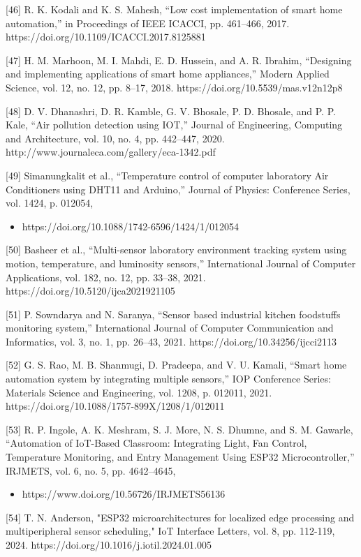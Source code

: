 [46] R. K. Kodali and K. S. Mahesh, ``Low cost implementation of smart home
automation,'' in Proceedings of IEEE ICACCI, pp. 461--466, 2017.
https://doi.org/10.1109/ICACCI.2017.8125881

[47] H. M. Marhoon, M. I. Mahdi, E. D. Hussein, and A. R. Ibrahim, ``Designing and
implementing applications of smart home appliances,'' Modern Applied Science, vol. 12,
no. 12, pp. 8--17, 2018. https://doi.org/10.5539/mas.v12n12p8

[48] D. V. Dhanashri, D. R. Kamble, G. V. Bhosale, P. D. Bhosale, and P. P. Kale, ``Air
pollution detection using IOT,'' Journal of Engineering, Computing and Architecture, vol.
10, no. 4, pp. 442--447, 2020. http://www.journaleca.com/gallery/eca-1342.pdf

[49] Simanungkalit et al., ``Temperature control of computer laboratory Air Conditioners
using DHT11 and Arduino,'' Journal of Physics: Conference Series, vol. 1424, p. 012054,
\begin{itemize}
  \item https://doi.org/10.1088/1742-6596/1424/1/012054
\end{itemize}

[50] Basheer et al., ``Multi-sensor laboratory environment tracking system using motion,
temperature, and luminosity sensors,'' International Journal of Computer Applications,
vol. 182, no. 12, pp. 33--38, 2021. https://doi.org/10.5120/ijca2021921105

[51] P. Sowndarya and N. Saranya, ``Sensor based industrial kitchen foodstuffs
monitoring system,'' International Journal of Computer Communication and Informatics,
vol. 3, no. 1, pp. 26--43, 2021. https://doi.org/10.34256/ijcci2113

[52] G. S. Rao, M. B. Shanmugi, D. Pradeepa, and V. U. Kamali, ``Smart home automation
system by integrating multiple sensors,'' IOP Conference Series: Materials Science and
Engineering, vol. 1208, p. 012011, 2021. https://doi.org/10.1088/1757-899X/1208/1/012011

[53] R. P. Ingole, A. K. Meshram, S. J. More, N. S. Dhumne, and S. M. Gawarle, ``Automation
of IoT-Based Classroom: Integrating Light, Fan Control, Temperature Monitoring, and
Entry Management Using ESP32 Microcontroller,'' IRJMETS, vol. 6, no. 5, pp. 4642--4645,
\begin{itemize}
  \item https://www.doi.org/10.56726/IRJMETS56136
\end{itemize}

[54] T. N. Anderson, "ESP32 microarchitectures for localized edge processing and multiperipheral sensor scheduling," IoT Interface Letters, vol. 8, pp. 112-119, 2024.
https://doi.org/10.1016/j.iotil.2024.01.005

